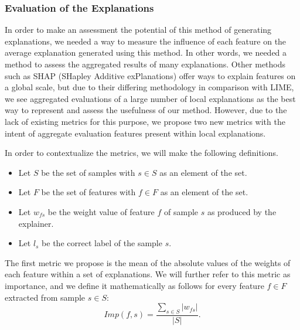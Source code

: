 \documentclass{article}
\begin{document}
\subsubsection{Evaluation of the Explanations}
In order to make an assessment the potential of this method of generating explanations, we needed a way to measure the influence of each feature on the average explanation generated using this method. In other words, we needed a method to assess the aggregated results of many explanations. Other methods such as SHAP (SHapley Additive exPlanations) \cite{lundberg2017unified} offer ways to explain features on a global scale, but due to their differing methodology in comparison with LIME, we see aggregated evaluations of a large number of local explanations as the best way to represent and assess the usefulness of our method. However, due to the lack of existing metrics for this purpose, we propose two new metrics with the intent of aggregate evaluation features present within local explanations.

In order to contextualize the metrics, we will make the following definitions.
    \begin{itemize}
        \item Let \(S\) be the set of samples with \(s \in S\) as an element of the set.
        \item Let \(F\) be the set of features with \(f \in F\) as an element of the set.
        \item Let \(w_{fs}\) be the weight value of feature \(f\) of sample \(s\) as
            produced by the explainer.
        \item Let \(l_{s}\) be the correct label of the sample \(s\).
    \end{itemize}
The first metric we propose is the mean of the absolute values of the weights of each feature within a set of explanations.
We will further refer to this metric as importance, and we define it mathematically as follows for every feature \(f \in F\) extracted from sample \(s \in S\):
\begin{equation}
    Imp(f, s) = \frac{\sum_{s \in S} |w_{fs}|}{|S|}.
\end{equation}
			
\end{document}
